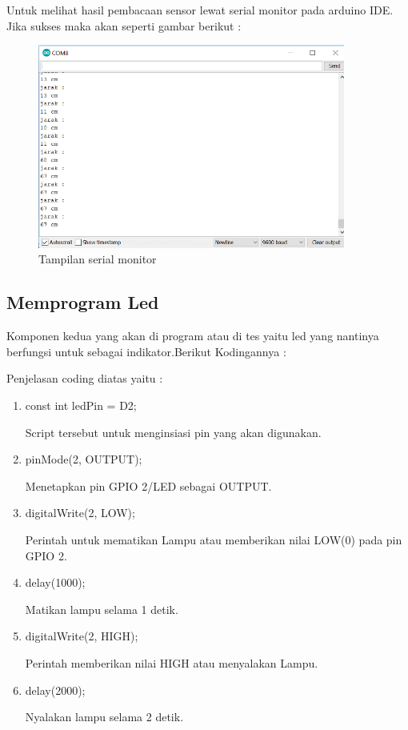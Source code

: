 \par Untuk melihat hasil pembacaan sensor lewat serial monitor pada arduino IDE. Jika sukses maka akan seperti gambar berikut :
\begin{figure}[H]
\centering
\includegraphics[width=0.9\textwidth]{figures/hasilsensor.png}
\caption{Tampilan serial monitor}
\label{print}
\end{figure}

\subsection{Memprogram Led}
\par Komponen kedua yang akan di program atau di tes yaitu led yang nantinya  berfungsi untuk sebagai indikator.Berikut Kodingannya :

\par Penjelasan coding diatas yaitu :
\begin{enumerate}
    \item const int ledPin = D2;
    \par Script tersebut untuk menginsiasi pin yang akan digunakan.
    \item pinMode(2, OUTPUT); 
    \par Menetapkan pin GPIO 2/LED sebagai OUTPUT.
    \item digitalWrite(2, LOW);
    \par  Perintah untuk mematikan Lampu atau memberikan nilai LOW(0) pada pin GPIO 2.
    \item delay(1000); 
    \par Matikan lampu selama 1 detik.
    \item digitalWrite(2, HIGH);
    \par Perintah memberikan nilai HIGH atau menyalakan Lampu.
    \item delay(2000);
    \par Nyalakan lampu selama 2 detik.
\end{enumerate}
